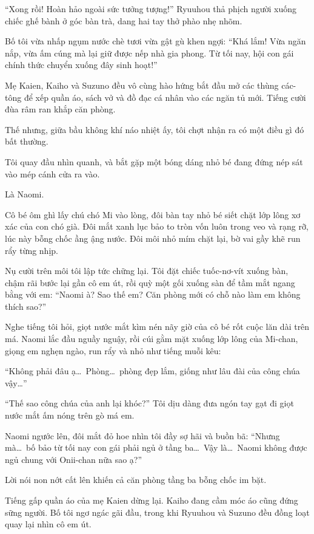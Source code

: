 \documentclass[../main.tex]{subfiles}
\begin{document}
``Xong rồi! Hoàn hảo ngoài sức tưởng tượng!'' Ryuuhou thả phịch người xuống chiếc ghế bành ở góc bàn trà, dang hai tay thở phào nhẹ nhõm.

Bố tôi vừa nhấp ngụm nước chè tươi vừa gật gù khen ngợi: ``Khá lắm! Vừa ngăn nắp, vừa ấm cúng mà lại giữ được nếp nhà gia phong. Từ tối nay, hội con gái chính thức chuyển xuống đây sinh hoạt!''

Mẹ Kaien, Kaiho và Suzuno đều vô cùng hào hứng bắt đầu mở các thùng các-tông để xếp quần áo, sách vở và đồ đạc cá nhân vào các ngăn tủ mới. Tiếng cười đùa râm ran khắp căn phòng.

Thế nhưng, giữa bầu không khí náo nhiệt ấy, tôi chợt nhận ra có một điều gì đó bất thường.

Tôi quay đầu nhìn quanh, và bắt gặp một bóng dáng nhỏ bé đang đứng nép sát vào mép cánh cửa ra vào.

Là Naomi.

Cô bé ôm ghì lấy chú chó Mi vào lòng, đôi bàn tay nhỏ bé siết chặt lớp lông xơ xác của con chó già. Đôi mắt xanh lục bảo to tròn vốn luôn trong veo và rạng rỡ, lúc này bỗng chốc ầng ậng nước. Đôi môi nhỏ mím chặt lại, bờ vai gầy khẽ run rẩy từng nhịp.

Nụ cười trên môi tôi lập tức chững lại. Tôi đặt chiếc tuốc-nơ-vít xuống bàn, chậm rãi bước lại gần cô em út, rồi quỳ một gối xuống sàn để tầm mắt ngang bằng với em: ``Naomi à? Sao thế em? Căn phòng mới có chỗ nào làm em không thích sao?''

Nghe tiếng tôi hỏi, giọt nước mắt kìm nén nãy giờ của cô bé rốt cuộc lăn dài trên má. Naomi lắc đầu nguầy nguậy, rồi cúi gằm mặt xuống lớp lông của Mi-chan, giọng em nghẹn ngào, run rẩy và nhỏ như tiếng muỗi kêu:

``Không phải đâu ạ\dots\ Phòng\dots\ phòng đẹp lắm, giống như lâu đài của công chúa vậy\dots''

``Thế sao công chúa của anh lại khóc?'' Tôi dịu dàng đưa ngón tay gạt đi giọt nước mắt ấm nóng trên gò má em.

Naomi ngước lên, đôi mắt đỏ hoe nhìn tôi đầy sợ hãi và buồn bã: ``Nhưng mà\dots\ bố bảo từ tối nay con gái phải ngủ ở tầng ba\dots\ Vậy là\dots\ Naomi không được ngủ chung với Onii-chan nữa sao ạ?''

Lời nói non nớt cất lên khiến cả căn phòng tầng ba bỗng chốc im bặt.

Tiếng gấp quần áo của mẹ Kaien dừng lại. Kaiho đang cầm móc áo cũng đứng sững người. Bố tôi ngơ ngác gãi đầu, trong khi Ryuuhou và Suzuno đều đồng loạt quay lại nhìn cô em út.
\end{document}
